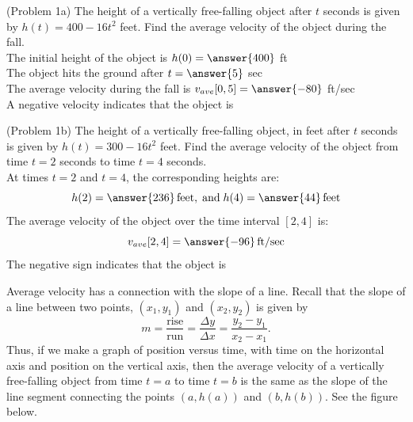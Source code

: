 \documentclass[handout]{ximera}
\begin{document}

\begin{problem}(Problem 1a)
The height of a vertically free-falling object after $t$ seconds is given by $h(t) = 400 - 16t^2$ feet.
Find the average velocity of the object during the fall. \\
The initial height of the object is $h(0) =\answer{400}$ ft\\
The object hits the ground after $t =\answer{5}$ sec\\
The average velocity during the fall is $v_{ave}[0, 5] = \answer{-80}$ ft/sec\\
A negative velocity indicates that the object is 
\end{problem}

\begin{problem}(Problem 1b)
The height of a vertically free-falling object, in feet after $t$ seconds is given by $h(t) = 300 - 16t^2$ feet.
Find the average velocity of the object from time $t = 2$ seconds to time $t = 4$ seconds.\\
At times $t = 2$ and $t= 4$, the corresponding heights are:
\[
h(2) = \answer{236}\, \text{feet}, \; \text{and} \; h(4) = \answer{44} \,\text{feet}
\]
The average velocity of the object over the time interval $[2,4]$ is: 
\[
v_{ave}[2,4] = \answer{-96}\, \text{ft/sec}
\]
The negative sign  indicates that the object is 
\end{problem}


Average velocity has a connection with the slope of a line. Recall that the slope of a line between two points, $(x_1, y_1)$
and $(x_2, y_2)$ is given by
\[
m = \frac{\text{rise}}{\text{run}} = \frac{\Delta y}{\Delta x} = \frac{y_2 - y_1}{x_2 -x_1}.
\]
Thus, if we make a graph of position versus time, with time on the horizontal axis and position on the vertical axis, then the average velocity 
of a vertically free-falling object from time $t = a$ to time $t = b$ is the same as the slope of the line segment
connecting the points $(a, h(a))$ and $(b, h(b))$. See the figure below.
\end{document}

